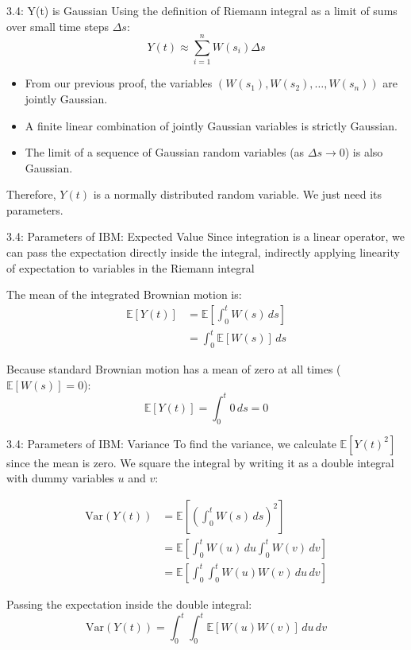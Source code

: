 \documentclass{beamer}
\begin{document}
	\begin{frame}{3.4: Y(t) is Gaussian}		
		Using the definition of Riemann integral as a limit of sums over small time steps $\Delta s$:
		$$Y(t) \approx \sum_{i=1}^n W(s_i) \Delta s$$
		
		\begin{itemize}
			\item From our previous proof, the variables $(W(s_1), W(s_2), \dots, W(s_n))$ are jointly Gaussian.
			\item A finite linear combination of jointly Gaussian variables is strictly Gaussian.
			\item The limit of a sequence of Gaussian random variables (as $\Delta s \to 0$) is also Gaussian.
		\end{itemize}
		
		Therefore, $Y(t)$ is a normally distributed random variable. We just need its parameters.
	\end{frame}
	
	\begin{frame}{3.4: Parameters of IBM: Expected Value}
		Since integration is a linear operator, we can pass the expectation directly inside the integral, indirectly applying linearity of expectation to variables in the Riemann integral
		
		The mean of the integrated Brownian motion is:
		\begin{align*}
			\mathbb{E}[Y(t)] &= \mathbb{E}\left[ \int_0^t W(s) \, ds \right] \\
			&= \int_0^t \mathbb{E}[W(s)] \, ds
		\end{align*}
		
		Because standard Brownian motion has a mean of zero at all times ($\mathbb{E}[W(s)] = 0$):
		$$ \mathbb{E}[Y(t)] = \int_0^t 0 \, ds = 0 $$
	\end{frame}
	
	\begin{frame}{3.4: Parameters of IBM: Variance}
		To find the variance, we calculate $\mathbb{E}[Y(t)^2]$ since the mean is zero. We square the integral by writing it as a double integral with dummy variables $u$ and $v$:
		
		\begin{align*}
			\text{Var}(Y(t)) &= \mathbb{E}\left[ \left( \int_0^t W(s) \, ds \right)^2 \right] \\
			&= \mathbb{E}\left[ \int_0^t W(u) \, du \int_0^t W(v) \, dv \right] \\
			&= \mathbb{E}\left[ \int_0^t \int_0^t W(u)W(v) \, du \, dv \right]
		\end{align*}
		
		\vspace{0.3cm}
		Passing the expectation inside the double integral:
		$$ \text{Var}(Y(t)) = \int_0^t \int_0^t \mathbb{E}[W(u)W(v)] \, du \, dv $$
	\end{frame}
	
\end{document}
